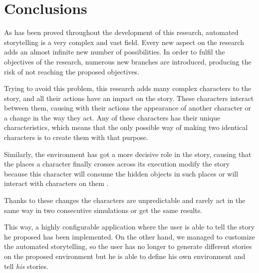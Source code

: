 %
%
\chapter*{Conclusions}

\begin{FraseCelebre}
\begin{Frase}
\end{Frase}
\begin{Fuente}
\end{Fuente}
\end{FraseCelebre}

\label{cap32:sec:Conclusions}

As has been proved throughout the development of this research, automated storytelling is a very complex and vast field. Every new aspect on the research adds an almost infinite new number of possibilities. In order to fulfil the objectives of the research, numerous new branches are introduced, producing the risk of not reaching the proposed objectives.


Trying to avoid this problem, this research adds many complex characters to the story, and all their actions have an impact on the story. These characters interact between them, causing with their actions the appearance of another character or a change in the way they act. Any of these characters has their unique characteristics, which means that the only possible way of making two identical characters is to create them with that purpose.


Similarly, the environment has got a more decisive role in the story, causing that the places a character finally crosses across its execution modify the story because this character will consume the hidden objects in such places or will interact with characters on them .



Thanks to these changes the characters are unpredictable and rarely act in the same way in two consecutive simulations or get the same results.


This way, a highly configurable application where the user is able to tell the story he proposed has been implemented.
On the other hand, we managed to customize the automated storytelling, so the user has no longer to generate different stories on the proposed environment but he is able to define his own environment and tell \emph{his} stories.


